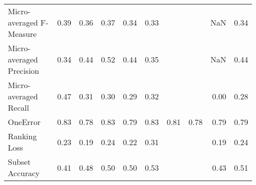 \begin{tabular}{l|rrrrrrrrr}
Micro-averaged F-Measure & 0.39 & 0.36 & 0.37 & 0.34 & 0.33 &  &  & NaN & 0.34 \\

Micro-averaged Precision & 0.34 & 0.44 & 0.52 & 0.44 & 0.35 &  &  & NaN & 0.44 \\

Micro-averaged Recall & 0.47 & 0.31 & 0.30 & 0.29 & 0.32 &  &  & 0.00 & 0.28 \\

OneError & 0.83 & 0.78 & 0.83 & 0.79 & 0.83 & 0.81 & 0.78 & 0.79 & 0.79 \\

Ranking Loss & 0.23 & 0.19 & 0.24 & 0.22 & 0.31 &  &  & 0.19 & 0.24 \\

Subset Accuracy & 0.41 & 0.48 & 0.50 & 0.50 & 0.53 &  &  & 0.43 & 0.51 \\

\end{tabular}
